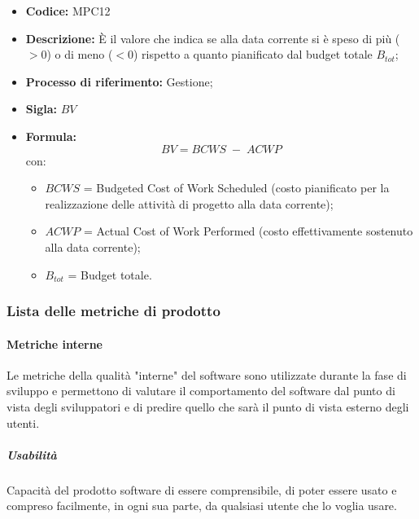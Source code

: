         \begin{itemize}
            \item \textbf{Codice:} MPC12
            \item \textbf{Descrizione:} È il valore che indica se alla data corrente si è speso di più ($>0$) o di meno ($<0$) rispetto a quanto pianificato dal budget totale $B_{tot}$;
            \item \textbf{Processo di riferimento:} Gestione;
            \item \textbf{Sigla:} $BV$
            \item \textbf{Formula:} $$BV = {BCWS \; - \; ACWP}$$
            con:
            \begin{itemize}
                \item $BCWS$ = Budgeted Cost of Work Scheduled (costo pianificato per la realizzazione delle attività di progetto alla data corrente);
                \item $ACWP$ = Actual Cost of Work Performed (costo effettivamente sostenuto alla data corrente);
                \item $B_{tot}$ = Budget totale.
            \end{itemize}
        \end{itemize}
\newpage
\subsubsection{Lista delle metriche di prodotto}
\paragraph{Metriche interne}
Le metriche della qualità "interne" del software sono utilizzate durante la fase di sviluppo e permettono di valutare il comportamento del software dal punto di vista degli sviluppatori e di predire quello che sarà il punto di vista esterno degli utenti.

\subparagraph{Usabilità}
Capacità del prodotto software di essere comprensibile, di poter essere usato e compreso facilmente, in ogni sua parte, da qualsiasi utente che lo voglia usare.\\

